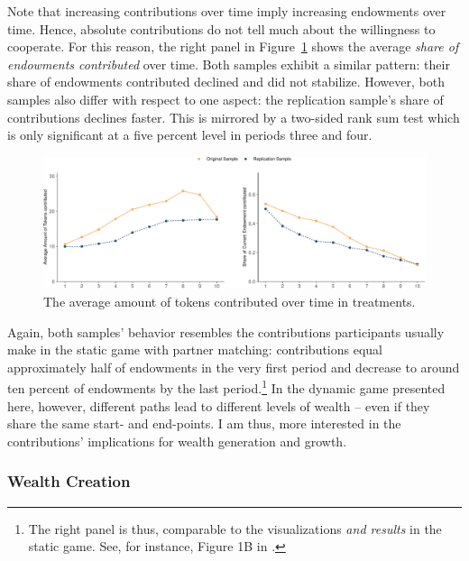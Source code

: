\documentclass[
  authoryear,
  preprint,
  3p]{elsarticle}
\begin{document}
Note that increasing contributions over time imply increasing endowments
over time. Hence, absolute contributions do not tell much about the
willingness to cooperate. For this reason, the right panel in
Figure~\ref{fig-share-of-contributions} shows the average \emph{share of
endowments contributed} over time. Both samples exhibit a similar
pattern: their share of endowments contributed declined and did not
stabilize. However, both samples also differ with respect to one aspect:
the replication sample's share of contributions declines faster. This is
mirrored by a two-sided rank sum test which is only significant at a
five percent level in periods three and four.

\begin{figure}

{\centering \includegraphics{paper_files/figure-pdf/fig-share-of-contributions-1.pdf}

}

\caption{\label{fig-share-of-contributions}The average amount of tokens
contributed over time in treatments.}

\end{figure}

Again, both samples' behavior resembles the contributions participants
usually make in the static game with partner matching: contributions
equal approximately half of endowments in the very first period and
decrease to around ten percent of endowments by the last
period.\footnote{The right panel is thus, comparable to the
  visualizations \emph{and results} in the static game. See, for
  instance, Figure 1B in \citet[p.986]{fehrgaechter2000}.} In the
dynamic game presented here, however, different paths lead to different
levels of wealth -- even if they share the same start- and end-points. I
am thus, more interested in the contributions' implications for wealth
generation and growth.

\hypertarget{sec-wealth}{%
\subsubsection{Wealth Creation}\label{sec-wealth}}
\end{document}
